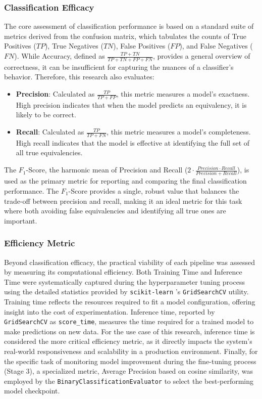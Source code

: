 \subsubsection{Classification Efficacy}
The core assessment of classification performance is based on a standard suite of metrics derived from the confusion matrix, which tabulates the counts of True Positives (\(TP\)), True Negatives (\(TN\)), False Positives (\(FP\)), and False Negatives (\(FN\)). While Accuracy, defined as \(\frac{TP + TN}{TP + TN + FP + FN}\), provides a general overview of correctness, it can be insufficient for capturing the nuances of a classifier's behavior. Therefore, this research also evaluates:
\begin{itemize}
    \item \textbf{Precision}: Calculated as \(\frac{TP}{TP + FP}\), this metric measures a model's exactness. High precision indicates that when the model predicts an equivalency, it is likely to be correct.
    \item \textbf{Recall}: Calculated as \(\frac{TP}{TP + FN}\), this metric measures a model's completeness. High recall indicates that the model is effective at identifying the full set of all true equivalencies.
\end{itemize}
The \(F_1\)-Score, the harmonic mean of Precision and Recall (\(2\cdot\frac{Precision\cdot Recall}{Precision + Recall}\)), is used as the primary metric for reporting and comparing the final classification performance. The \(F_1\)-Score provides a single, robust value that balances the trade-off between precision and recall, making it an ideal metric for this task where both avoiding false equivalencies and identifying all true ones are important.

\subsubsection{Efficiency Metric}
Beyond classification efficacy, the practical viability of each pipeline was assessed by measuring its computational efficiency. Both Training Time and Inference Time were systematically captured during the hyperparameter tuning process using the detailed statistics provided by \verb|scikit-learn| \!\!'s \verb|GridSearchCV| utility. Training time reflects the resources required to fit a model configuration, offering insight into the cost of experimentation. Inference time, reported by \verb|GridSearchCV| as \verb|score_time|, measures the time required for a trained model to make predictions on new data. For the use case of this research, inference time is considered the more critical efficiency metric, as it directly impacts the system's real-world responsiveness and scalability in a production environment. Finally, for the specific task of monitoring model improvement during the fine-tuning process (Stage 3), a specialized metric, Average Precision based on cosine similarity, was employed by the \verb|BinaryClassificationEvaluator| to select the best-performing model checkpoint.

